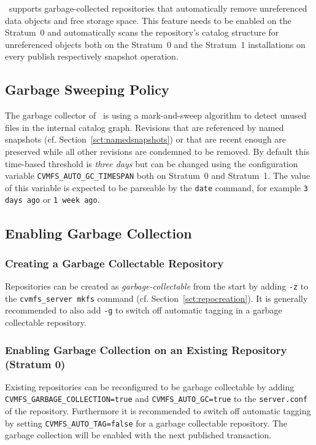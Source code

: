 \cvmfs\ supports garbage-collected repositories that automatically remove unreferenced data objects and free storage space.
This feature needs to be enabled on the Stratum~0 and automatically scans the repository's catalog structure for unreferenced objects both on the Stratum~0 and the Stratum~1 installations on every publish respectively snapshot operation.

\subsection{Garbage Sweeping Policy}
The garbage collector of \cvmfs\ is using a mark-and-sweep algorithm to detect unused files in the internal catalog graph.
%
Revisions that are referenced by named snapshots (cf. Section~\ref{sct:namedsnapshots}) or that are recent enough are preserved while all other revisions are condemned to be removed.
By default this time-based threshold is \emph{three days} but can be changed using the configuration variable \texttt{CVMFS\_AUTO\_GC\_TIMESPAN} both on Stratum~0 and Stratum~1.
The value of this variable is expected to be parseable by the \texttt{date} command, for example \texttt{3 days ago} or \texttt{1 week ago}.

\subsection{Enabling Garbage Collection}
\label{sct:enablegc}

\subsubsection{Creating a Garbage Collectable Repository}
Repositories can be created as \emph{garbage-collectable} from the start by adding \texttt{-z} to the \texttt{cvmfs\_server mkfs} command (cf. Section~\ref{sct:repocreation}).
It is generally recommended to also add \texttt{-g} to switch off automatic tagging in a garbage collectable repository.

\subsubsection{Enabling Garbage Collection on an Existing Repository (Stratum 0)}
Existing repositories can be reconfigured to be garbage collectable by adding\\ \texttt{CVMFS\_GARBAGE\_COLLECTION=true} and \texttt{CVMFS\_AUTO\_GC=true} to the \texttt{server.conf} of the repository.
Furthermore it is recommended to switch off automatic tagging by setting \texttt{CVMFS\_AUTO\_TAG=false} for a garbage collectable repository.
The garbage collection will be enabled with the next published transaction.

